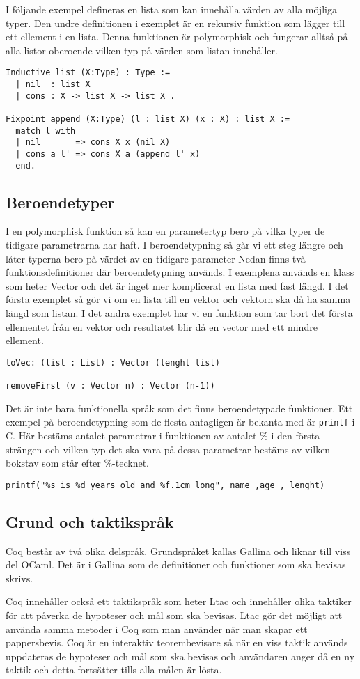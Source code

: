 I följande exempel defineras en lista som kan innehålla värden av alla möjliga
typer. Den undre definitionen i exemplet är en rekursiv funktion som lägger till
ett ellement i en lista. Denna funktionen är polymorphisk och fungerar alltså på
alla listor oberoende vilken typ på värden som listan innehåller.
\begin{lstlisting}
Inductive list (X:Type) : Type :=
  | nil  : list X
  | cons : X -> list X -> list X .

Fixpoint append (X:Type) (l : list X) (x : X) : list X :=
  match l with
  | nil       => cons X x (nil X)
  | cons a l' => cons X a (append l' x)
  end.
\end{lstlisting}

\subsection{Beroendetyper}
I en polymorphisk funktion så kan en parametertyp bero på vilka typer de
tidigare parametrarna har haft. I beroendetypning så går vi ett steg längre och
låter typerna bero på värdet av en tidigare parameter Nedan finns två
funktionsdefinitioner där beroendetypning används. I exemplena används en klass
som heter Vector och det är inget mer komplicerat en lista med fast längd. I
det första exemplet så gör vi om en lista till en vektor och vektorn ska då ha
samma längd som listan. I det andra exemplet har vi en funktion som tar bort
det första ellementet från en vektor och resultatet blir då en vector med ett
mindre ellement.
\begin{verbatim}
toVec: (list : List) : Vector (lenght list)

removeFirst (v : Vector n) : Vector (n-1))
\end{verbatim}
Det är inte bara funktionella språk som det finns beroendetypade funktioner.
Ett exempel på beroendetypning som de flesta antagligen är bekanta med är
\texttt{printf} i C. Här bestäms antalet parametrar i funktionen av antalet \%
i den första strängen och vilken typ det ska vara på dessa parametrar bestäms
av vilken bokstav som står efter \%-tecknet.
\begin{verbatim}
printf("%s is %d years old and %f.1cm long", name ,age , lenght)
\end{verbatim}


\subsection{Grund och taktikspråk}
Coq består av två olika delspråk. Grundspråket kallas Gallina och liknar till
viss del OCaml. Det är i Gallina som de definitioner och funktioner som ska
bevisas skrivs.

Coq innehåller också ett taktikspråk som heter Ltac och innehåller olika
taktiker för att påverka de hypoteser och mål som ska bevisas. Ltac gör det
möjligt att använda samma metoder i Coq som man använder när man skapar ett
pappersbevis. Coq är en interaktiv teorembevisare så när en viss taktik används
uppdateras de hypoteser och mål som ska bevisas och användaren anger då en ny
taktik och detta fortsätter tills alla målen är lösta.
